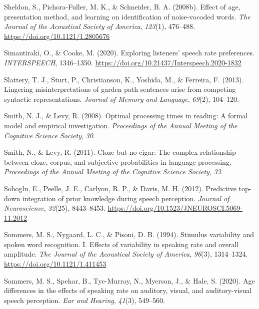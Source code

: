 \documentclass[a4paper, nobind]{templates/ociamthesis}
\newlength{\cslhangindent}
\newenvironment{CSLReferences}[2] %
 {%
  \setlength{\parindent}{0pt}
  \ifodd #1
  \let\oldpar\par
  \def\par{\hangindent=\cslhangindent\oldpar}
  \fi
  \setlength{\parskip}{1mm}
  \setlength{\baselineskip}{6mm}
 }%
 {}
\begin{document}
\begin{CSLReferences}{1}{0}
\leavevmode{}%
Sheldon, S., Pichora-Fuller, M. K., \& Schneider, B. A. (2008b). Effect of age, presentation method, and learning on identification of noise-vocoded words. \emph{The Journal of the Acoustical Society of America}, \emph{123}(1), 476--488. \url{https://doi.org/10.1121/1.2805676}

\leavevmode{}%
Simantiraki, O., \& Cooke, M. (2020). {Exploring listeners' speech rate preferences}. \emph{INTERSPEECH}, 1346--1350. \url{https://doi.org/10.21437/Interspeech.2020-1832}

\leavevmode{}%
Slattery, T. J., Sturt, P., Christianson, K., Yoshida, M., \& Ferreira, F. (2013). Lingering misinterpretations of garden path sentences arise from competing syntactic representations. \emph{Journal of Memory and Language}, \emph{69}(2), 104--120.

\leavevmode{}%
Smith, N. J., \& Levy, R. (2008). Optimal processing times in reading: A formal model and empirical investigation. \emph{Proceedings of the Annual Meeting of the Cognitive Science Society}, \emph{30}.

\leavevmode{}%
Smith, N., \& Levy, R. (2011). Cloze but no cigar: The complex relationship between cloze, corpus, and subjective probabilities in language processing. \emph{Proceedings of the Annual Meeting of the Cognitive Science Society}, \emph{33}.

\leavevmode{}%
Sohoglu, E., Peelle, J. E., Carlyon, R. P., \& Davis, M. H. (2012). {Predictive top-down integration of prior knowledge during speech perception}. \emph{Journal of Neuroscience}, \emph{32}(25), 8443--8453. \url{https://doi.org/10.1523/JNEUROSCI.5069-11.2012}

\leavevmode{}%
Sommers, M. S., Nygaard, L. C., \& Pisoni, D. B. (1994). Stimulus variability and spoken word recognition. I. Effects of variability in speaking rate and overall amplitude. \emph{The Journal of the Acoustical Society of America}, \emph{96}(3), 1314--1324. \url{https://doi.org/10.1121/1.411453}

\leavevmode{}%
Sommers, M. S., Spehar, B., Tye-Murray, N., Myerson, J., \& Hale, S. (2020). Age differences in the effects of speaking rate on auditory, visual, and auditory-visual speech perception. \emph{Ear and Hearing}, \emph{41}(3), 549--560.


\end{CSLReferences}
\end{document}
